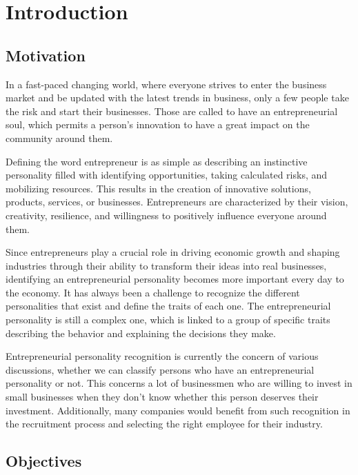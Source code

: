 
%

\chapter{Introduction}
\label{chap:intro}

\section{Motivation}

In a fast-paced changing world, where everyone strives to enter the business market and be updated with the latest trends in business, only a few people take the risk and start their businesses. Those are called to have an entrepreneurial soul, which permits a person's innovation to have a great impact on the community around them. 

Defining the word entrepreneur is as simple as describing an instinctive personality filled with identifying opportunities, taking calculated risks, and mobilizing resources. This results in the creation of innovative solutions, products, services, or businesses. Entrepreneurs are characterized by their vision, creativity, resilience, and willingness to positively influence everyone around them.

Since entrepreneurs play a crucial role in driving economic growth and shaping industries through their ability to transform their ideas into real businesses, identifying an entrepreneurial personality becomes more important every day to the economy. It has always been a challenge to recognize the different personalities that exist and define the traits of each one. The entrepreneurial personality is still a complex one, which is linked to a group of specific traits describing the behavior and explaining the decisions they make.

Entrepreneurial personality recognition is currently the concern of various discussions, whether we can classify persons who have an entrepreneurial personality or not. This concerns a lot of businessmen who are willing to invest in small businesses when they don't know whether this person deserves their investment. Additionally, many companies would benefit from such recognition in the recruitment process and selecting the right employee for their industry.

\section{Objectives}

